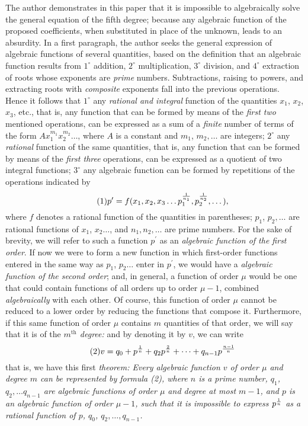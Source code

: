 \documentclass[oneside, 12 pt, leqno]{memoir}
\let\oldfrac\frac
\def\frac#1#2{\mathchoice{\text{\scalebox{.83}{${\oldfrac{#1}{#2}}$}}}{\text{\scalebox{.83}{${\displaystyle\oldfrac{#1}{#2}}$}}}{\genfrac{}{}{}{2}{#1}{#2}}{\genfrac{}{}{}{3}{#1}{#2}}}
\begin{document}
The author demonstrates in this paper that it is impossible to algebraically solve the general equation of the fifth degree; because any algebraic function of the proposed coefficients, when substituted in place of the unknown, leads to an absurdity. In a first paragraph, the author seeks the general expression of algebraic functions of several quantities, based on the definition that an algebraic function results from \(1^{\circ}\) addition, \(2^{\circ}\) multiplication, \(3^{\circ}\) division, and \(4^{\circ}\) extraction of roots whose exponents are \textit{prime} numbers. Subtractions, raising to powers, and extracting roots with \textit{composite} exponents fall into the previous operations. Hence it follows that \(1^{\circ}\) any \textit{rational and integral} function of the quantities \(x_1\), \(x_2\), \(x_3\), etc., that is, any function that can be formed by means of the \textit{first two} mentioned operations, can be expressed as a sum of a \textit{finite} number of terms of the form \(A x_1^{m_1} x_2^{m_2}\dots\), where \(A\) is a constant and \(m_1\), \(m_2, \dots\) are integers; \(2^{\circ}\) any \textit{rational} function of the same quantities, that is, any function that can be formed by means of the \textit{first three} operations, can be expressed as a quotient of two integral functions; \(3^{\circ}\) any algebraic function can be formed by repetitions of the operations indicated by
\[\tag{1} p^{\prime}=f (x_1, x_2, x_3 \dots p_1^{\frac{1}{n_1}}, p_2^{\frac{1}{n_2}}, \dots),\]
where \(f\) denotes a rational function of the quantities in parentheses; \(p_1\), \(p_2, \dots\) are rational functions of \(x_1\), \(x_2\dots\), and \(n_1, n_2, \dots\) are prime numbers. For the sake of brevity, we will refer to such a function  \(p^{\prime}\) as an \textit{algebraic function of the first order}. If now we were to form a new function in which first-order functions entered in the same way as \(p_1\), \(p_2 \dots\) enter in \(p^{\prime}\), we would have a \textit{algebraic function of the second order}; and, in general, a function of order \(\mu\) would be one that could contain functions of all orders up to order \(\mu-1\), combined \textit{algebraically} with each other. Of course, this function of order \(\mu\) cannot be reduced to a lower order by reducing the functions that compose it. Furthermore, if this same function of order \(\mu\) contains \(m\) quantities of that order, we will say that it is of the \textit{\(m^{\text{th}}\) degree:} and by denoting it by \(v\), we can write
\[\tag{2} v=q_0+p^{\frac{1}{n}}+q_2 p^{\frac{2}{n}}+\dots+q_{n-1} p^{\frac{n-1}{n}}\]
that is, we have this first \textit{theorem: Every algebraic function \(v\) of order \(\mu\) and degree \(m\) can be represented by formula (2), where \(n\) is a prime number, \(q_1\), \(q_2, \dots q_{n-1}\) are algebraic functions of order \(\mu\) and degree at most \(m-1\), and \(p\) is an algebraic function of order \(\mu-1\), such that it is impossible to express \(p^{\frac{1}{n}}\) as a rational function of \(p\), \(q_0\), \(q_2, \dots, q_{n-1}\).}
\end{document}
